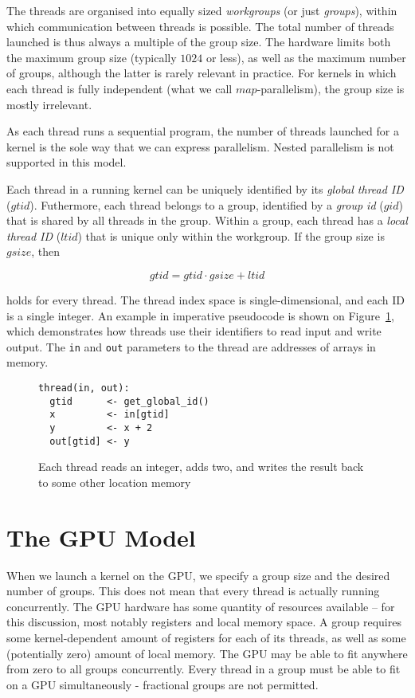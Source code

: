 The threads are organised into equally sized
\textit{workgroups} (or just \textit{groups}), within which
communication between threads is possible.  The total number of
threads launched is thus always a multiple of the group size.  The
hardware limits both the maximum group size (typically $1024$ or
less), as well as the maximum number of groups, although the latter is
rarely relevant in practice.  For kernels in which each thread is
fully independent (what we call $map$-parallelism), the group size is
mostly irrelevant.

As each thread runs a sequential program, the number of threads
launched for a kernel is the sole way that we can express parallelism.
Nested parallelism is not supported in this model.

Each thread in a running kernel can be uniquely identified by its
\textit{global thread ID} ($gtid$).  Futhermore, each thread belongs to
a group, identified by a \textit{group id} ($gid$) that is shared by
all threads in the group.  Within a group, each thread has a \textit{local thread ID} ($ltid$) that is unique only within the workgroup.  If the group size is $gsize$, then

\[
gtid = gtid \cdot gsize + ltid
\]

holds for every thread.  The thread index space is single-dimensional,
and each ID is a single integer.  An example in imperative pseudocode
is shown on Figure~\ref{fig:gpu-map}, which demonstrates how threads
use their identifiers to read input and write output.  The \texttt{in}
and \texttt{out} parameters to the thread are addresses of arrays in
memory.

\begin{figure}
  \centering
\begin{lstlisting}[language={}]
thread(in, out):
  gtid      <- get_global_id()
  x         <- in[gtid]
  y         <- x + 2
  out[gtid] <- y
\end{lstlisting}
  \caption{Each thread reads an integer, adds two, and writes the
    result back to some other location memory}
  \label{fig:gpu-map}
\end{figure}

\section{The GPU Model}

When we launch a kernel on the GPU, we specify a group size and the
desired number of groups.  This does not mean that every thread is
actually running concurrently.  The GPU hardware has some quantity of
resources available -- for this discussion, most notably registers and
local memory space.  A group requires some kernel-dependent amount of
registers for each of its threads, as well as some (potentially zero)
amount of local memory.  The GPU may be able to fit anywhere from zero
to all groups concurrently.  Every thread in a group must be able to
fit on a GPU simultaneously - fractional groups are not permitted.

